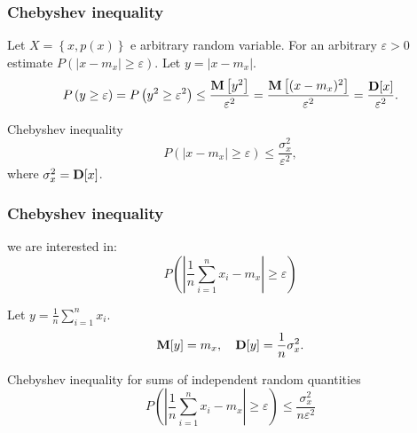 \documentclass[14pt]{beamer}
\begin{document}
\begin{frame}
\frametitle{Chebyshev inequality}
\begin{itemize}
\small{

    
    \item Let $X = \left\{ {x,p(x)} \right\}$ e arbitrary random variable. For an arbitrary $\varepsilon > 0$ estimate $P\left( {\left| {x - m_x } \right| \ge \varepsilon } \right)$. Let $y = \left| {x - m_x } \right|$.
    \[
    P\left( {y \ge \varepsilon } \right) = P\left( {y^2 \ge \varepsilon ^2}
    \right) \le \frac{{\rm {\bf M}}\left[ {y^2} \right]}{\varepsilon ^2} =
    \frac{{\rm {\bf M}}\left[ {(x - m_x )^2} \right]}{\varepsilon ^2}
     = \frac{{\rm {\bf D}}[x]}{\varepsilon ^2}.
    \]

    \item Chebyshev inequality
    \begin{equation}
    \label{eq23}
    P\left( {\left| {x - m_x } \right| \ge \varepsilon } \right) \le
    \frac{\sigma _x^2 }{\varepsilon ^2},
    \end{equation}
    where $\sigma _x^2 = {\rm {\bf D}}[x]$. 
}
\end{itemize}
\end{frame}


\begin{frame}
\frametitle{Chebyshev inequality}
\begin{itemize}
\small{  
  
    \item we are interested in:
    \[
    P\left( {\left| {\frac{1}{n}\sum\limits_{i = 1}^n {x_i } - m_x } \right| \ge
    \varepsilon } \right)
    \]
    
    \item Let $y = \frac{1}{n}\sum_{i = 1}^n {x_i } $.
    \[
    {\rm {\bf M}}[y] = m_x ,
    \quad
    {\rm {\bf D}}[y] = \frac{1}{n}\sigma _x^2 .
    \]
    
    
    \item Chebyshev inequality for sums of independent random
    quantities
    \begin{equation}
    P\left( {\left| {\frac{1}{n}\sum\limits_{i = 1}^n {x_i } - m_x }
    \right| \ge \varepsilon } \right) \le \frac{\sigma _x^2
    }{n\varepsilon ^2} \label{cheb}
    \end{equation} 

}
\end{itemize}
\end{frame}
\end{document}
